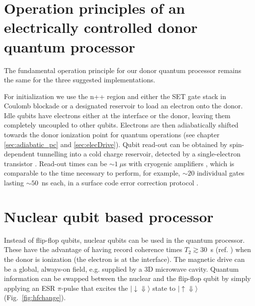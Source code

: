 \section{Operation principles of an electrically controlled donor quantum processor}

The fundamental operation principle for our donor quantum processor remains the same for the three suggested implementations. 

For initialization we use the n++ region and either the SET gate stack in Coulomb blockade or a designated reservoir to load an electron onto the donor. 
Idle qubits have electrons either at the interface or the donor, leaving them completely uncoupled to other qubits. Electrons are then adiabatically shifted towards the donor ionization point for quantum operations (see chapter \ref{sec:adiabatic_pc} and \ref{sec:elecDrive}).
Qubit read-out can be obtained by spin-dependent tunnelling into a cold charge reservoir, detected by a single-electron transistor \cite{Morello2010}. Read-out times can be $\sim1~\mu$s with cryogenic amplifiers \cite{Curry2015}, which is comparable to the time necessary to perform, for example, $\sim 20$ individual gates lasting $\sim 50$~ns each, in a surface code error correction protocol \cite{Fowler2012}.

\section{Nuclear qubit based processor}

Instead of flip-flop qubits, nuclear qubits can be used in the quantum processor. These have the advantage of having record coherence times $T_2 \gtrsim 30$~s (ref. \cite{Muhonen2014}) when the donor is ionization (the electron is at the interface). The magnetic drive can be a global, always-on field, e.g. supplied by a 3D microwave cavity. Quantum information can be swapped between the nuclear and the flip-flop qubit by simply applying an ESR $\pi$-pulse that excites the $\lvert{\downarrow\Downarrow}\rangle$ state to $\lvert{\uparrow\Downarrow}\rangle$ (Fig.~\ref{fig:hfchange}).
